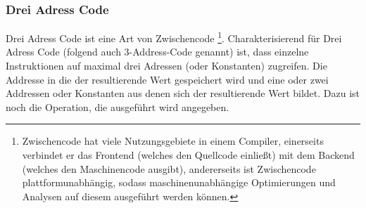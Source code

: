 \subsubsection{Drei Adress Code} \label{t:tac}
Drei Adress Code ist eine Art von Zwischencode
\footnote{Zwischencode hat viele Nutzungsgebiete in einem Compiler,
einerseits verbindet er das Frontend (welches den Quellcode einließt) mit dem
Backend (welches den Maschinencode ausgibt), andererseits ist Zwischencode 
plattformunabhängig, sodass maschinenunabhängige Optimierungen und Analysen auf
diesem ausgeführt werden können.}. 
Charakterisierend für Drei Adress Code (folgend auch 3-Address-Code genannt)
ist, dass einzelne Instruktionen auf maximal drei Adressen (oder Konstanten) 
zugreifen. Die Addresse in die der resultierende Wert gespeichert wird und 
eine oder zwei Addressen oder Konstanten aus denen sich der resultierende Wert bildet.
Dazu ist noch die Operation, die ausgeführt wird angegeben.\\

